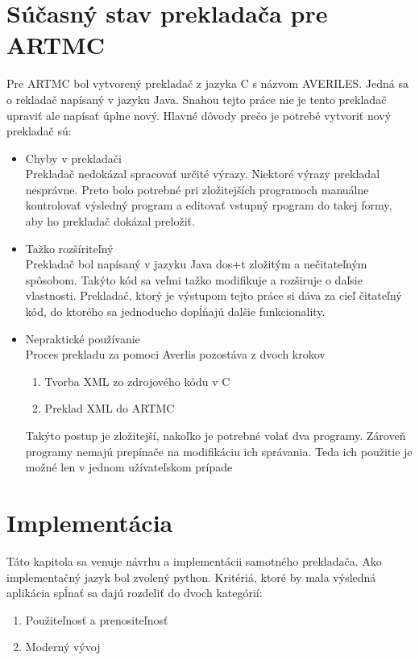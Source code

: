 \chapter{Súčasný stav prekladača pre ARTMC}
Pre ARTMC bol vytvorený prekladač z jazyka C s názvom AVERILES. Jedná sa o
rekladač napísaný v jazyku Java. Snahou tejto práce nie je tento prekladač
upraviť ale napísať úplne nový. Hlavné dôvody prečo je potrebé vytvoriť nový
prekladač sú:
\begin{itemize}
    \item Chyby v prekladači\\
        Prekladač nedokázal spracovať určité výrazy. Niektoré výrazy prekladal nesprávne.
        Preto bolo potrebné pri zložitejších programoch manuálne kontrolovať výsledný
        program a editovať vstupný rpogram do takej formy, aby ho prekladač dokázal
        preložiť.
    \item Tažko rozšíriteľný\\
        Prekladač bol napísaný v jazyku Java dos+t zložitým a nečitateľným spôsobom. Takýto
        kód sa veľmi tažko modifikuje a rozširuje o daľsie vlastnosti. Prekladač,
        ktorý je výstupom tejto práce si dáva za cieľ čitateľný kód, do ktorého
        sa jednoducho dopĺňajú dalšie funkcionality.
    \item Nepraktické používanie\\
        Proces prekladu za pomoci Averlis pozostáva z dvoch krokov
        \begin{enumerate}
            \item Tvorba XML zo zdrojového kódu v C
            \item Preklad XML do ARTMC
        \end{enumerate}
        Takýto postup je zložitejší, nakoľko je potrebné volať dva programy.
        Zároveň programy nemajú prepínače na modifikáciu ich správania. Teda
        ich použitie je možné len v jednom užívateľskom prípade
\end{itemize}


\chapter{Implementácia}
Táto kapitola sa venuje návrhu a implementácii samotného prekladača.
Ako implementačný jazyk bol zvolený python. Kritériá, ktoré by mala výsledná
aplikácia spĺnať sa dajú rozdeliť do dvoch kategórií:
\begin{enumerate}
    \item Použiteľnosť a prenositeľnosť
    \item Moderný vývoj
\end{enumerate}

